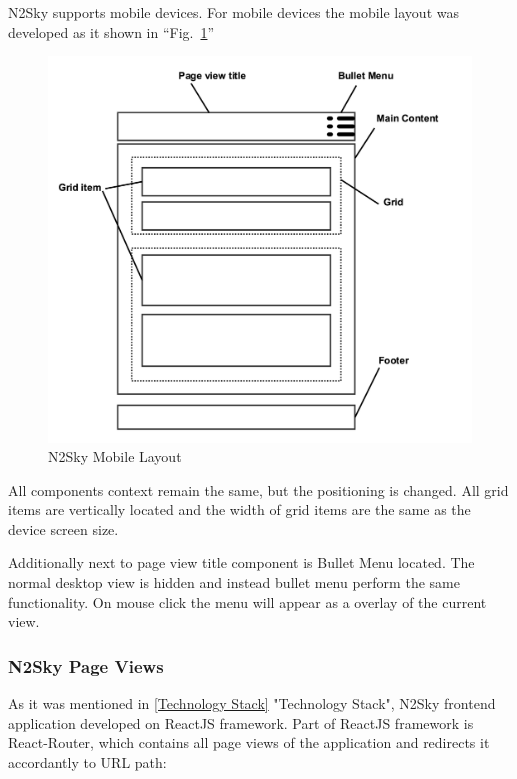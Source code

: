 N2Sky supports mobile devices. For mobile devices the mobile layout was developed as it shown in ``Fig.~\ref{fig:layout_mobile}''

\begin{figure}[htbp]
\begin{center}
  \includegraphics[width=\linewidth]{components/3/components/layout_mobile.png}
  \caption{N2Sky Mobile Layout}
  \label{fig:layout_mobile}
\end{center}
\end{figure}

All components context remain the same, but the positioning is changed. All grid items are vertically located and the width of grid items are the same as the device screen size. 

Additionally next to page view title component is Bullet Menu located. The normal desktop view is hidden and instead bullet menu perform the same functionality. On mouse click the menu will appear as a overlay of the current view. 

\subsubsection{N2Sky Page Views}\label{N2Sky Page Views}

As it was mentioned in \autoref{Technology Stack} "Technology Stack", N2Sky frontend application developed on ReactJS framework. Part of ReactJS framework is React-Router, which contains all page views of the application and redirects it accordantly to URL path:

